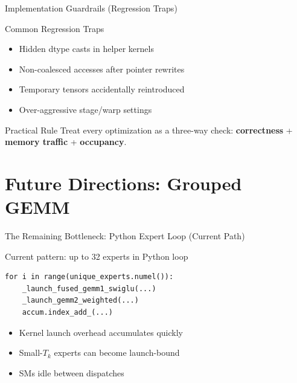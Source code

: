 \documentclass[aspectratio=169,11pt]{beamer}
\begin{document}
\begin{frame}[t]{Implementation Guardrails (Regression Traps)}
\small
\begin{alertblock}{Common Regression Traps}
\begin{itemize}
    \item Hidden dtype casts in helper kernels
    \item Non-coalesced accesses after pointer rewrites
    \item Temporary tensors accidentally reintroduced
    \item Over-aggressive stage/warp settings
\end{itemize}
\end{alertblock}

\begin{exampleblock}{Practical Rule}
Treat every optimization as a three-way check:
\textbf{correctness} + \textbf{memory traffic} + \textbf{occupancy}.
\end{exampleblock}
\end{frame}

\section{Future Directions: Grouped GEMM}

\begin{frame}[fragile,t]{The Remaining Bottleneck: Python Expert Loop (Current Path)}
\small
\begin{alertblock}{Current pattern: up to 32 experts in Python loop}
\begin{lstlisting}[basicstyle=\ttfamily\scriptsize]
for i in range(unique_experts.numel()):
    _launch_fused_gemm1_swiglu(...)
    _launch_gemm2_weighted(...)
    accum.index_add_(...)
\end{lstlisting}
\end{alertblock}

\begin{itemize}
    \item Kernel launch overhead accumulates quickly
    \item Small-$T_k$ experts can become launch-bound
    \item SMs idle between dispatches
\end{itemize}
\end{frame}
\end{document}
